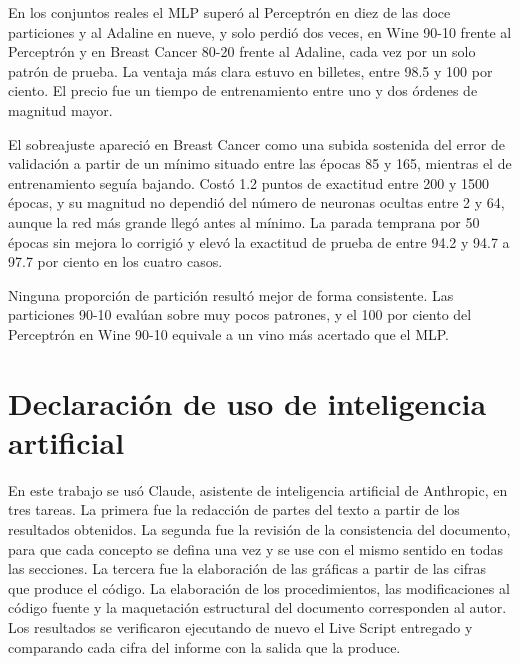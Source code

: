 \documentclass[11pt,letterpaper]{article}
\begin{document}
En los conjuntos reales el MLP superó al Perceptrón en diez de las doce particiones y al Adaline en nueve, y solo perdió dos veces, en Wine 90-10 frente al Perceptrón y en Breast Cancer 80-20 frente al Adaline, cada vez por un solo patrón de prueba. La ventaja más clara estuvo en billetes, entre 98.5 y 100 por ciento. El precio fue un tiempo de entrenamiento entre uno y dos órdenes de magnitud mayor.

El sobreajuste apareció en Breast Cancer como una subida sostenida del error de validación a partir de un mínimo situado entre las épocas 85 y 165, mientras el de entrenamiento seguía bajando. Costó 1.2 puntos de exactitud entre 200 y 1500 épocas, y su magnitud no dependió del número de neuronas ocultas entre 2 y 64, aunque la red más grande llegó antes al mínimo. La parada temprana por 50 épocas sin mejora lo corrigió y elevó la exactitud de prueba de entre 94.2 y 94.7 a 97.7 por ciento en los cuatro casos.

Ninguna proporción de partición resultó mejor de forma consistente. Las particiones 90-10 evalúan sobre muy pocos patrones, y el 100 por ciento del Perceptrón en Wine 90-10 equivale a un vino más acertado que el MLP.

\section{Declaración de uso de inteligencia artificial}

En este trabajo se usó Claude, asistente de inteligencia artificial de Anthropic, en tres tareas. La primera fue la redacción de partes del texto a partir de los resultados obtenidos. La segunda fue la revisión de la consistencia del documento, para que cada concepto se defina una vez y se use con el mismo sentido en todas las secciones. La tercera fue la elaboración de las gráficas a partir de las cifras que produce el código. La elaboración de los procedimientos, las modificaciones al código fuente y la maquetación estructural del documento corresponden al autor. Los resultados se verificaron ejecutando de nuevo el Live Script entregado y comparando cada cifra del informe con la salida que la produce.
\end{document}

